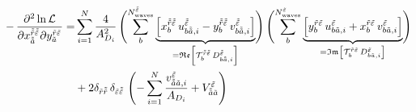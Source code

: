 \begin{align}
\begin{split}
  \end{split} \\
  \label{eq:likelihood_function_im_re_deriv}
  \begin{split}
  -\dmd{\ln \mathcal{L}}{2}{{x_{\doubletilde{a}}^{\doubletilde{r} \doubletilde{\refl}}}}{}{{y_{\tilde{a}}^{\tilde{r} \tilde{\refl}}}}{}
  = &\sum_{i = 1}^{N} \frac{4}{A_{D_i}^2}
  \rBrk[4]{\sum_b^{N^{\doubletilde{\refl}}_\text{waves}}
  \underbrace{\sBrk{x_b^{\doubletilde{r} \doubletilde{\refl}}\, u^{\doubletilde{\refl}}_{b \doubletilde{a}, i}
    - y_b^{\doubletilde{r} \doubletilde{\refl}}\, v^{\doubletilde{\refl}}_{b \doubletilde{a}, i}}}_{%
     = \Re\sBrk{\mathcal{T}_b^{\doubletilde{r} \doubletilde{\refl}}\, D^{\doubletilde{\refl}}_{b \doubletilde{a}, i}}}}
  \rBrk[4]{\sum_b^{N^{\tilde{\refl}}_\text{waves}}
  \underbrace{\sBrk{y_b^{\tilde{r} \tilde{\refl}}\, u^{\tilde{\refl}}_{b \tilde{a}, i}
    + x_b^{\tilde{r} \tilde{\refl}}\, v^{\tilde{\refl}}_{b \tilde{a}, i}}}_{%
    = \Im\sBrk{\mathcal{T}_b^{\tilde{r} \tilde{\refl}}\, D^{\tilde{\refl}}_{b \tilde{a}, i}}}} \\
  &+ 2 \delta_{\tilde{r} \doubletilde{r}}\, \delta_{\tilde{\refl} \doubletilde{\refl}}\,
  \rBrk[4]{-\sum_{i = 1}^{N} \frac{v^{\tilde{\refl}}_{\doubletilde{a} \tilde{a}, i}}{A_{D_i}} + V^{\tilde{\refl}}_{\doubletilde{a} \tilde{a}}}
  \end{split}
\end{align}
